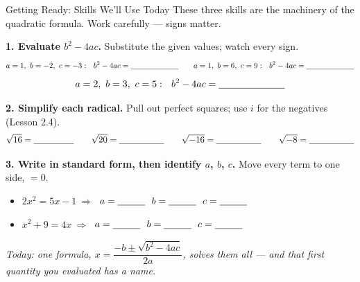 \documentclass[10pt]{article}
\begin{document}

\vspace{0.10in}

\begin{notesbox}{Getting Ready: Skills We'll Use Today}
\small These three skills are the machinery of the quadratic formula. Work carefully --- signs matter.

\vspace{4pt}
\textbf{1. Evaluate $b^2-4ac$.} Substitute the given values; watch every sign.
\[
  a=1,\ b=-2,\ c=-3:\ \ b^2-4ac=\blank{2.2cm} \qquad
  a=1,\ b=6,\ c=9:\ \ b^2-4ac=\blank{2.2cm}
\]
\[
  a=2,\ b=3,\ c=5:\ \ b^2-4ac=\blank{2.4cm}
\]

\vspace{4pt}
\textbf{2. Simplify each radical.} Pull out perfect squares; use $i$ for the negatives (Lesson 2.4).
\[
  \sqrt{16}=\blank{1.6cm} \qquad \sqrt{20}=\blank{1.8cm} \qquad
  \sqrt{-16}=\blank{1.8cm} \qquad \sqrt{-8}=\blank{1.8cm}
\]

\vspace{4pt}
\textbf{3. Write in standard form, then identify $a$, $b$, $c$.} Move every term to one side, $=0$.
\begin{itemize}\setlength{\itemsep}{3pt}
  \item $2x^2=5x-1 \ \Rightarrow\ $ \blank{3.0cm} \hfill $a=\blank{1.0cm}\ \ b=\blank{1.0cm}\ \ c=\blank{1.0cm}$
  \item $x^2+9=4x \ \Rightarrow\ $ \blank{3.0cm} \hfill $a=\blank{1.0cm}\ \ b=\blank{1.0cm}\ \ c=\blank{1.0cm}$
\end{itemize}
\emph{Today: one formula, $x=\dfrac{-b\pm\sqrt{b^2-4ac}}{2a}$, solves them all --- and that first quantity you evaluated has a name.}
\end{notesbox}
\end{document}
